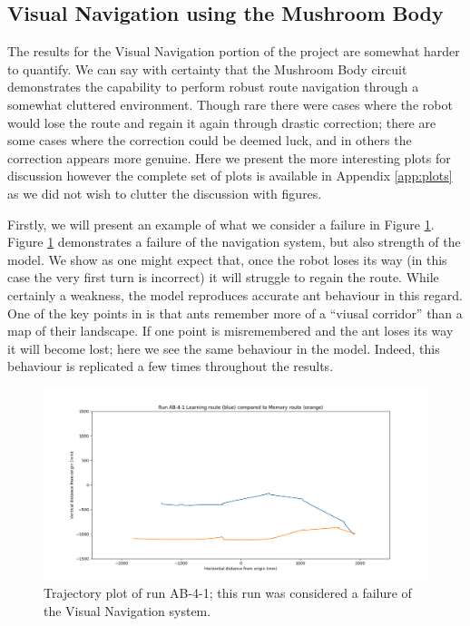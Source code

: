 \documentclass[a4paper,11pt,twoside,openright]{article}
\begin{document}
\subsection{Visual Navigation using the Mushroom Body}
The results for the Visual Navigation portion of the project are somewhat harder to quantify. We can say with certainty that the Mushroom Body circuit
demonstrates the capability to perform robust route navigation through a somewhat cluttered environment. Though rare there were cases where the robot would
lose the route and regain it again through drastic correction; there are some cases where the correction could be deemed luck, and in others the correction
appears more genuine. Here we present the more interesting plots for discussion however the complete set of plots is available in Appendix \ref{app:plots}
as we did not wish to clutter the discussion with figures. 
\newline

Firstly, we will present an example of what we consider a failure in Figure \ref{fig:ab-4-1-fail}. Figure \ref{fig:ab-4-1-fail}
demonstrates a failure of the navigation system, but also strength of the model. We show as one might expect that, once the
robot loses its way (in this case the very first turn is incorrect) it will struggle to regain the route. While certainly a
weakness, the model reproduces accurate ant behaviour in this regard. One of the key points in \cite{Wehner2006} is that
ants remember more of a ``viusal corridor'' than a map of their landscape. If one point is misremembered and the ant loses
its way it will become lost; here we see the same behaviour in the model. Indeed, this behaviour is replicated a few times
throughout the results.

\begin{figure}
 \centering
  \includegraphics[width=\textwidth]{AB-4-1}
  \caption{
    \label{fig:ab-4-1-fail} Trajectory plot of run AB-4-1; this run was considered a failure of the
    Visual Navigation system.
  }
\end{figure}
\end{document}
